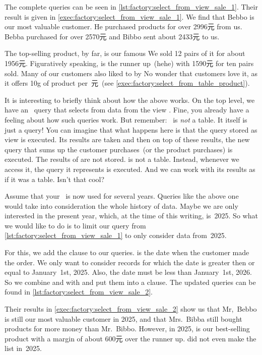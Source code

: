 The complete queries can be seen in \cref{lst:factory:select_from_view_sale_1}.
Their result is given in \cref{exec:factory:select_from_view_sale_1}.
We find that Bebbo is our most valuable customer.
He purchased products for over 2996元 from us.
Bebba purchased for over 2570元 and Bibbo sent about 2433元 to us.

The top-selling product, by far, is our famous 
We sold 12 pairs of it for about 1956元.
Figuratively speaking,  is the runner up~(hehe) with 1590元 for ten pairs sold.
Many of our customers also liked to by 
No wonder that customers love it, as it offers 10g of product per~元~(see \cref{exec:factory:select_from_table_product}).

It is interesting to briefly think about how the above works.
On the top level, we have an \sql\ query that selects from data from the view .
Fine, you already have a feeling about how such queries work.
But remember:~ is \emph{not} a table.
It itself is just a query!
You can imagine that what happens here is that the query stored as view  is executed.
Its results are taken and then on top of these results, the new query that sums up the customer purchases~(or the product purchases) is executed.
The results of  are not stored.
 is not a table.
Instead, whenever we access it, the query it represents is executed.
And we can work with its results as if it was a table.
Isn't that cool?

Assume that your \db\ is now used for several years.
Queries like the above one would take into consideration the whole history of data.
Maybe we are only interested in the present year, which, at the time of this writing, is~2025.
So what we would like to do is to limit our query from \cref{lst:factory:select_from_view_sale_1} to only consider data from~2025.%
%
\begin{sloppypar}%
For this, we add the clause  to our queries.
 is the date when the customer made the order.
We only want to consider records for which the date is greater then or equal to January~1st, 2025.
Also, the date must be less than January~1st, 2026.
So we combine  and  with  and put them into a  clause.
The updated queries can be found in \cref{lst:factory:select_from_view_sale_2}.%
\end{sloppypar}%
%
Their results in \cref{exec:factory:select_from_view_sale_2} show us that Mr,~Bebbo is still our most valuable customer in 2025, and that Mrs.~Bibba still bought products for more money than Mr.~Bibbo.
However, in 2025,  is our best-selling product with a margin of about 600元 over the runner up.
 did not even make the list in~2025.

